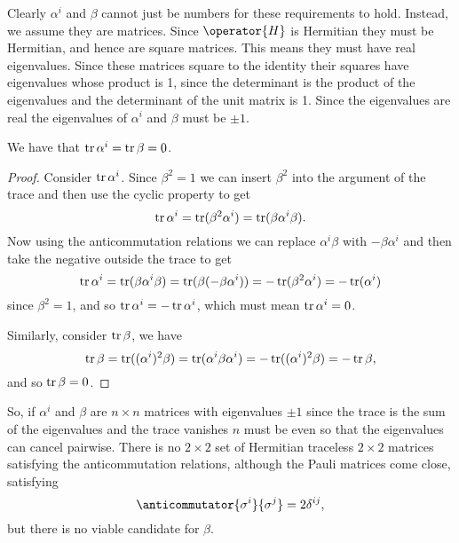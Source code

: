 Clearly \(\alpha^i\) and \(\beta\) cannot just be numbers for these requirements to hold.
Instead, we assume they are matrices.
Since \(\operator{H}\) is Hermitian they must be Hermitian, and hence are square matrices.
This means they must have real eigenvalues.
Since these matrices square to the identity their squares have eigenvalues whose product is 1, since the determinant is the product of the eigenvalues and the determinant of the unit matrix is 1.
Since the eigenvalues are real the eigenvalues of \(\alpha^i\) and \(\beta\) must be \(\pm 1\).
\begin{lma}{}{}
    We have that \(\operatorname{tr} \alpha^i = \operatorname{tr} \beta = 0\).
    \begin{proof}
        Consider \(\operatorname{tr}\alpha^i\).
        Since \(\beta^2 = 1\) we can insert \(\beta^2\) into the argument of the trace and then use the cyclic property to get
        \begin{equation}
            \operatorname{tr} \alpha^i = \operatorname{tr}(\beta^2\alpha^i) = \operatorname{tr}(\beta\alpha^i\beta).
        \end{equation}
        Now using the anticommutation relations we can replace \(\alpha^i\beta\) with \(-\beta\alpha^i\) and then take the negative outside the trace to get
        \begin{equation}
            \operatorname{tr} \alpha^i = \operatorname{tr}(\beta\alpha^i\beta) = \operatorname{tr}(\beta(-\beta\alpha^i)) = -\operatorname{tr}(\beta^2\alpha^i) = -\operatorname{tr}(\alpha^i)
        \end{equation}
        since \(\beta^2 = 1\), and so \(\operatorname{tr}\alpha^i = -\operatorname{tr}\alpha^i\), which must mean \(\operatorname{tr}\alpha^i = 0\).
        
        Similarly, consider \(\operatorname{tr}\beta\), we have
        \begin{equation}
            \operatorname{tr}\beta = \operatorname{tr}((\alpha^i)^2\beta) = \operatorname{tr}(\alpha^i\beta\alpha^i) = -\operatorname{tr}((\alpha^i)^2\beta) = -\operatorname{tr} \beta,
        \end{equation}
        and so \(\operatorname{tr}\beta = 0\).
    \end{proof}
\end{lma}

So, if \(\alpha^i\) and \(\beta\) are \(n \times n\) matrices with eigenvalues \(\pm 1\) since the trace is the sum of the eigenvalues and the trace vanishes \(n\) must be even so that the eigenvalues can cancel pairwise.
There is no \(2\times 2\) set of Hermitian traceless \(2\times 2\) matrices satisfying the anticommutation relations, although the Pauli matrices come close, satisfying
\begin{equation}
    \anticommutator{\sigma^i}{\sigma^j} = 2\delta^{ij},
\end{equation}
but there is no viable candidate for \(\beta\).

